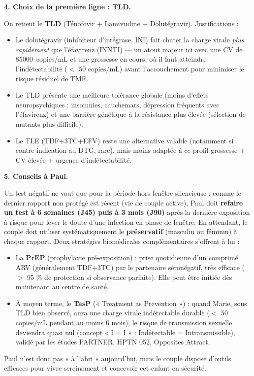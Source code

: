 \documentclass[11pt]{article}
\begin{document}
\begin{exoresolu}
\textbf{4. Choix de la première ligne : TLD.}

On retient le \textbf{TLD} (Ténofovir + Lamivudine + Dolutégravir). Justifications :
\begin{itemize}
\item Le dolutégravir (inhibiteur d'intégrase, INI) fait chuter la charge virale \emph{plus rapidement} que l'éfavirenz (INNTI) — un atout majeur ici avec une CV de \SI{85 000}{copies/mL} et une grossesse en cours, où il faut atteindre l'indétectabilité ($<$ 50 copies/mL) avant l'accouchement pour minimiser le risque résiduel de TME.
\item Le TLD présente une meilleure tolérance globale (moins d'effets neuropsychiques : insomnies, cauchemars, dépression fréquents avec l'éfavirenz) et une barrière génétique à la résistance plus élevée (sélection de mutants plus difficile).
\item Le TLE (TDF+3TC+EFV) reste une alternative valable (notamment si contre-indication au DTG, rare), mais moins adaptée à ce profil grossesse + CV élevée + urgence d'indétectabilité.
\end{itemize}

\textbf{5. Conseils à Paul.}

Un test négatif ne vaut que pour la période hors fenêtre silencieuse : comme le dernier rapport non protégé est récent (vie de couple active), Paul doit \textbf{refaire un test à 6 semaines (J45) puis à 3 mois (J90)} après la dernière exposition à risque pour lever le doute d'une infection en phase de fenêtre. En attendant, le couple doit utiliser systématiquement le \textbf{préservatif} (masculin ou féminin) à chaque rapport. Deux stratégies biomédicales complémentaires s'offrent à lui :
\begin{itemize}
\item La \textbf{PrEP} (prophylaxie pré-exposition) : prise quotidienne d'un comprimé ARV (généralement TDF+3TC) par le partenaire séronégatif, très efficace ($>$ 95 \% de protection si observance parfaite). Elle peut être initiée dès maintenant au centre de santé.
\item À moyen terme, le \textbf{TasP} (« Treatment as Prevention ») : quand Marie, sous TLD bien observé, aura une charge virale indétectable durable ($<$ 50 copies/mL pendant au moins 6 mois), le risque de transmission sexuelle deviendra quasi nul (concept « I = I » : Indétectable = Intransmissible), validé par les études PARTNER, HPTN 052, Opposites Attract.
\end{itemize}
Paul n'est donc pas « à l'abri » aujourd'hui, mais le couple dispose d'outils efficaces pour vivre sereinement et concevoir cet enfant en sécurité.


\end{exoresolu}
\end{document}
